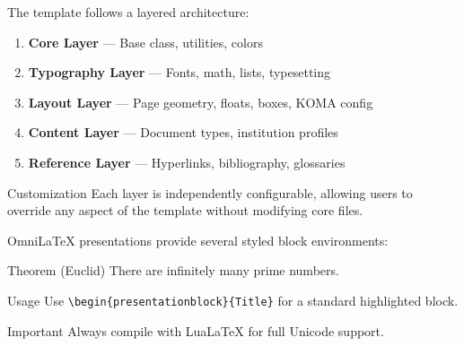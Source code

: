 \documentclass[
    language=english,
    doctype=presentation,
    institution=none,
]{../../omnilatex}
\begin{document}



\begin{presentationframe}

    The template follows a layered architecture:

    \begin{enumerate}
        \item \textbf{Core Layer} --- Base class, utilities, colors
        \item \textbf{Typography Layer} --- Fonts, math, lists, typesetting
        \item \textbf{Layout Layer} --- Page geometry, floats, boxes, KOMA config
        \item \textbf{Content Layer} --- Document types, institution profiles
        \item \textbf{Reference Layer} --- Hyperlinks, bibliography, glossaries
    \end{enumerate}

    \begin{noteblock}{Customization}
        Each layer is independently configurable, allowing users to override
        any aspect of the template without modifying core files.
    \end{noteblock}
\end{presentationframe}


\begin{presentationframe}

    OmniLaTeX presentations provide several styled block environments:

    \begin{definitionblock}{Theorem (Euclid)}
        There are infinitely many prime numbers.
    \end{definitionblock}

    \begin{exampleblock}{Usage}
        Use \texttt{\textbackslash begin\{presentationblock\}\{Title\}}
        for a standard highlighted block.
    \end{exampleblock}

    \begin{alertblock}{Important}
        Always compile with LuaLaTeX for full Unicode support.
    \end{alertblock}
\end{presentationframe}
\end{document}
